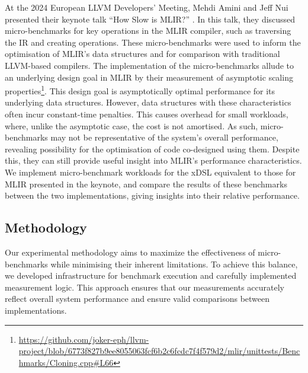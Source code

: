 At the 2024 European LLVM Developers' Meeting, Mehdi Amini and Jeff Nui
presented their keynote talk ``How Slow is MLIR?'' \cite{aminiHowSlowMLIR2024}.
In this talk, they discussed micro-benchmarks for key operations in the MLIR compiler, such as traversing the IR and creating operations. These micro-benchmarks were used to inform the optimisation of MLIR's data structures and for comparison with traditional LLVM-based compilers. The implementation of the micro-benchmarks allude to an underlying design goal in MLIR by their measurement of asymptotic scaling properties\footnote{\url{https://github.com/joker-eph/llvm-project/blob/6773f827b9ee8055063fcf6b2c6fcdc7f4f579d2/mlir/unittests/Benchmarks/Cloning.cpp\#L66}}. This design goal is asymptotically optimal performance for its underlying data structures. However, data structures with these characteristics often incur constant-time penalties. %
This causes overhead for small workloads, where, unlike the asymptotic case, the cost is not amortised. As such, micro-benchmarks may not be representative of the system's overall performance, revealing possibility for the optimisation of code co-designed using them.
Despite this, they can still provide useful insight into MLIR's performance characteristics. 
We implement micro-benchmark workloads for the xDSL equivalent to those for MLIR presented in the keynote, and compare the results of these benchmarks between the two implementations, giving insights into their relative performance.


\subsection{Methodology}
\label{ssec:ubenchmark-methodology}

Our experimental methodology aims to maximize the effectiveness of micro-benchmarks while minimising their inherent limitations.
To achieve this balance, we developed infrastructure for benchmark execution and carefully implemented measurement logic.
This approach ensures that our measurements accurately reflect overall system performance and ensure valid comparisons between implementations.

